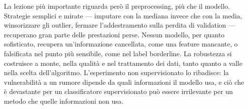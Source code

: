 \documentclass[12pt,a4paper]{article}
\begin{document}
La lezione più importante riguarda però il preprocessing, più che il modello. Strategie semplici e mirate
--- imputare con la mediana invece che con la media, winsorizzare gli outlier, fermare l'addestramento sulla
perdita di validation --- recuperano gran parte delle prestazioni perse. Nessun modello, per quanto
sofisticato, recupera un'informazione cancellata, come una feature mancante, o falsificata nel punto più
sensibile, come nel label borderline. La robustezza si costruisce a monte, nella qualità e nel trattamento
dei dati, tanto quanto a valle nella scelta dell'algoritmo. L'esperimento non supervisionato lo ribadisce: la
vulnerabilità a un rumore dipende da quali informazioni il modello usa, e ciò che è devastante per un
classificatore supervisionato può essere irrilevante per un metodo che quelle informazioni non usa.
\end{document}
